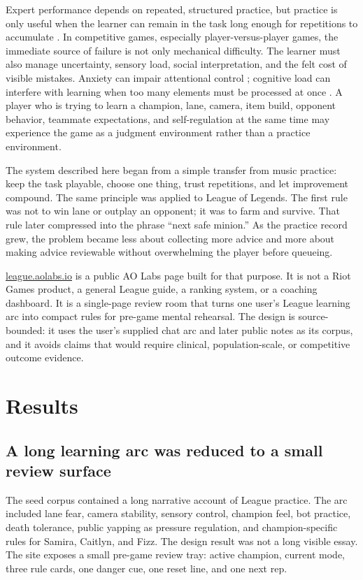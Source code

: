 \documentclass[12pt,letterpaper]{article}
\begin{document}
Expert performance depends on repeated, structured practice, but practice is only useful when the learner can remain in the task long enough for repetitions to accumulate \cite{ericsson1993}. In competitive games, especially player-versus-player games, the immediate source of failure is not only mechanical difficulty. The learner must also manage uncertainty, sensory load, social interpretation, and the felt cost of visible mistakes. Anxiety can impair attentional control \cite{eysenck2007}; cognitive load can interfere with learning when too many elements must be processed at once \cite{sweller1988}. A player who is trying to learn a champion, lane, camera, item build, opponent behavior, teammate expectations, and self-regulation at the same time may experience the game as a judgment environment rather than a practice environment.

The system described here began from a simple transfer from music practice: keep the task playable, choose one thing, trust repetitions, and let improvement compound. The same principle was applied to League of Legends. The first rule was not to win lane or outplay an opponent; it was to farm and survive. That rule later compressed into the phrase ``next safe minion.'' As the practice record grew, the problem became less about collecting more advice and more about making advice reviewable without overwhelming the player before queueing.

\href{https://league.aolabs.io}{league.aolabs.io} is a public AO Labs page built for that purpose. It is not a Riot Games product, a general League guide, a ranking system, or a coaching dashboard. It is a single-page review room that turns one user's League learning arc into compact rules for pre-game mental rehearsal. The design is source-bounded: it uses the user's supplied chat arc and later public notes as its corpus, and it avoids claims that would require clinical, population-scale, or competitive outcome evidence.

\section{Results}

\subsection{A long learning arc was reduced to a small review surface}

The seed corpus contained a long narrative account of League practice. The arc included lane fear, camera stability, sensory control, champion feel, bot practice, death tolerance, public yapping as pressure regulation, and champion-specific rules for Samira, Caitlyn, and Fizz. The design result was not a long visible essay. The site exposes a small pre-game review tray: active champion, current mode, three rule cards, one danger cue, one reset line, and one next rep.
\end{document}
